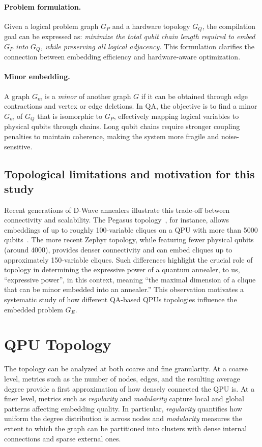 \documentclass[11pt,acmsmall,nonacm]{acmart}
\begin{document}
\paragraph{Problem formulation.}
Given a logical problem graph $G_P$ and a hardware topology $G_Q$, the compilation goal can be expressed as:
\emph{minimize the total qubit chain length required to embed $G_P$ into $G_Q$, while preserving all logical adjacency.}
This formulation clarifies the connection between embedding efficiency and hardware-aware optimization.

\paragraph{Minor embedding.}
A graph $G_m$ is a \emph{minor} of another graph $G$ if it can be obtained through edge contractions and vertex or edge deletions.
In QA, the objective is to find a minor $G_m$ of $G_Q$ that is isomorphic to $G_P$, effectively mapping logical variables to physical qubits through chains.
Long qubit chains require stronger coupling penalties to maintain coherence, making the system more fragile and noise-sensitive.

\subsection{Topological limitations and motivation for this study}

Recent generations of D-Wave annealers illustrate this trade-off between connectivity and scalability.
The Pegasus topology~\cite{Pegasus}, for instance, allows embeddings of up to roughly 100-variable cliques on a QPU with more than 5000 qubits~\cite{mscthesis}.
The more recent Zephyr topology, while featuring fewer physical qubits (around 4000), provides denser connectivity and can embed cliques up to approximately 150-variable cliques.
Such differences highlight the crucial role of topology in determining the expressive power of a quantum annealer, to us, ``expressive power'', in this context, meaning ``the maximal dimension of a clique that can be minor embedded into an annealer.''
This observation motivates a systematic study of how different QA-based QPUs topologies influence the embedded problem $G_E$.

\section{QPU Topology}

The topology can be analyzed at both coarse and fine granularity.
At a coarse level, metrics such as the number of nodes, edges, and the resulting average degree provide a first approximation of how densely connected the QPU is.
At a finer level, metrics such as \emph{regularity} and \emph{modularity} capture local and global patterns affecting embedding quality.
In particular, \emph{regularity} quantifies how uniform the degree distribution is across nodes and \emph{modularity} measures the extent to which the graph can be partitioned into clusters with dense internal connections and sparse external ones.
\end{document}
